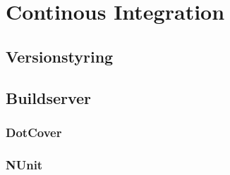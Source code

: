 \thispagestyle{fancy}
\chapter{Continous Integration}
\label{chp:contintegration}

\section{Versionstyring}
\section{Buildserver}
\subsection{DotCover}
\subsection{NUnit}

